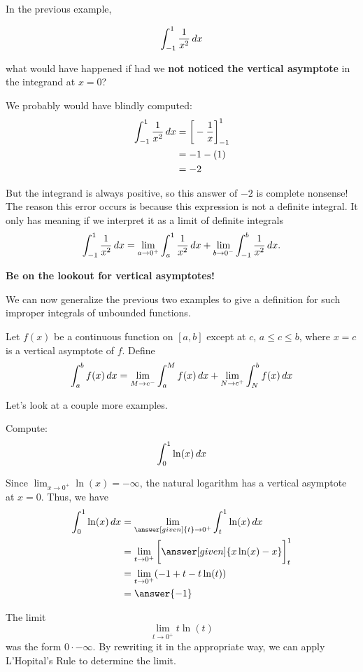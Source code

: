 \documentclass{ximera}
\begin{document}
\begin{warning}
In the previous example,

\[
\int_{-1}^{1} \frac{1}{x^{2}} \mathop{}\!d x
\]

 what would have happened if had we \textbf{not
  noticed the vertical asymptote} in the integrand at $x=0$?

We probably would have blindly computed:
\begin{align*}
  \int_{-1}^1\frac1{x^2}\mathop{}\!d x &= \bigg[ -\frac{1}{x} \bigg]_{-1}^1\\
  &= -1 - (1)\\
  &=-2
\end{align*}

But the integrand is always positive, so this answer of $-2$ is
complete nonsense! The reason this error occurs is because this expression is not a definite integral. It only has meaning if we
interpret it as a limit of definite integrals 
\[
 \int_{-1}^1 \frac{1}{x^{2}} \mathop{}\!d x = \lim_{a \to 0^+} \int_{a}^1 \frac{1}{x^2} \mathop{}\!d x  + \lim_{b \to 0^-} \int_{-1}^{b} \frac{1}{x^2} \mathop{}\!d x.
\]


\textbf{Be on the lookout for vertical asymptotes!}
\end{warning}


We can now generalize the previous two examples to give a definition for such 
improper integrals of unbounded functions.

\begin{definition}
Let $f(x)$ be a continuous function on $[a,b]$ except at $c$, $a\leq
c\leq b$, where $x=c$ is a vertical asymptote of $f$. Define
\[
\int_a^b f(x)\mathop{}\!d x = \lim_{M\to c^-}\int_a^M f(x)\mathop{}\!d x + \lim_{N\to c^+}\int_N^b f(x)\mathop{}\!d x
\]
\end{definition}

Let's look at a couple more examples. 


\begin{example}
  Compute:
  \[
  \int_0^1 \ln(x)\mathop{}\!d x
  \]
  \begin{explanation}
    Since $\lim_{x\to 0^+} \ln(x) = -\infty$, the natural logarithm
    has a vertical asymptote at $x = 0$. Thus, we have
    \begin{align*}
    \int_0^1 \ln(x) \d x &=\lim_{\answer[given]{t}\to 0^+} \int_t^1 \ln(x) \d x \\
    &= \lim_{t\to 0^+} \eval{\answer[given]{x \ln(x)-x}}_t^1 \\
    &=\lim_{t \to 0^{+}} ( -1 + t - t\ln(t) ) \\
&=\answer{ -1} 
      \end{align*}
\begin{hint}
The limit 
\[
\lim_{t \to 0^{+}} t\ln(t)
\]
was the form $0\cdot -\infty$. By rewriting it in the appropriate way, we can apply L'Hopital's Rule to 
determine the limit. 
\end{hint}
  \end{explanation}
\end{example}
\end{document}
